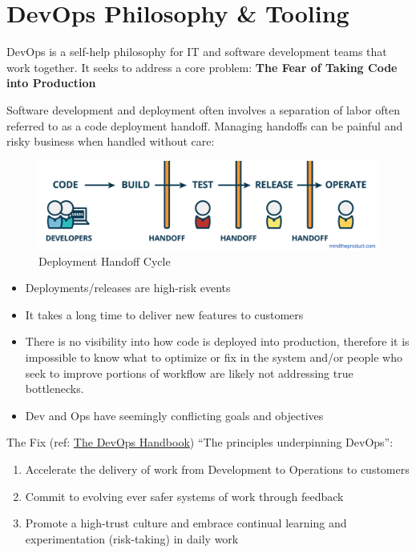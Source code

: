 \documentclass[]{book}
\providecommand{\tightlist}{%
  \setlength{\itemsep}{0pt}\setlength{\parskip}{0pt}}
\theoremstyle{definition}
\theoremstyle{definition}
\theoremstyle{definition}
\theoremstyle{remark}
\begin{document}
\hypertarget{devops-philosophy-tooling}{%
\chapter{DevOps Philosophy \& Tooling}\label{devops-philosophy-tooling}}

DevOps is a self-help philosophy for IT and software development teams
that work together. It seeks to address a core problem: \textbf{The Fear
of Taking Code into Production}

Software development and deployment often involves a separation of labor
often referred to as a code deployment handoff. Managing handoffs can be
painful and risky business when handled without care:

\begin{figure}
\centering
\includegraphics{imgs/devops/code-handoff.png}
\caption{Deployment Handoff Cycle}
\end{figure}

\begin{itemize}
\tightlist
\item
  Deployments/releases are high-risk events
\item
  It takes a long time to deliver new features to customers
\item
  There is no visibility into how code is deployed into production,
  therefore it is impossible to know what to optimize or fix in the
  system and/or people who seek to improve portions of workflow are
  likely not addressing true bottlenecks.
\item
  Dev and Ops have seemingly conflicting goals and objectives
\end{itemize}

The Fix (ref:
\href{https://www.amazon.com/dp/1942788002/ref=cm_sw_r_tw_dp_U_x_bUwpCbBTAM8HQ}{The
DevOps Handbook}) ``The principles underpinning DevOps'':

\begin{enumerate}
\def\labelenumi{\arabic{enumi}.}
\tightlist
\item
  Accelerate the delivery of work from Development to Operations to
  customers
\item
  Commit to evolving ever safer systems of work through feedback
\item
  Promote a high-trust culture and embrace continual learning and
  experimentation (risk-taking) in daily work
\end{enumerate}
\end{document}
